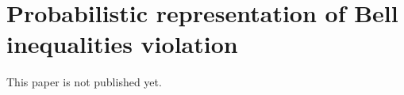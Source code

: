 \chapter{Probabilistic representation of Bell inequalities violation}
\label{cha:bell-ineq}

This paper is not published yet.
